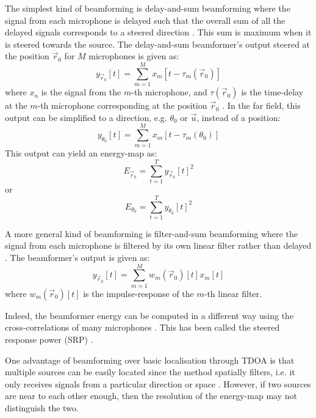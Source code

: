 \documentclass{report}
\begin{document}
The simplest kind of beamforming is delay-and-sum beamforming where the signal from each microphone is delayed such that the overall sum of all the delayed signals corresponds to a steered direction \cite{rascon_localization_2017}. This sum is maximum when it is steered towards the source. The delay-and-sum beamformer's output steered at the position $\vec{r}_0$ for $M$ microphones is given as:
\begin{equation}
y_{\vec{r}_0}[t] = \sum_{m=1}^M x_m[t-\tau_m(\vec{r}_0)] 
\end{equation}
where $x_n$ is the signal from the $m$-th microphone, and $\tau(\vec{r}_0)$ is the time-delay at the $m$-th microphone corresponding at the position $\vec{r}_0$ \cite{argentieri_survey_2015}. In the far field, this output can be simplified to a direction, e.g. $\theta_0$ or $\vec{u}$, instead of a position:
\begin{equation}
y_{\theta_0}[t] = \sum_{m=1}^M x_m[t-\tau_m(\theta_0)] 
\end{equation}
This output can yield an energy-map as:
\begin{equation}
E_{\vec{r}_0} = \sum_{t=1}^T y_{\vec{r}_0}[t]^2
\end{equation}
or
\begin{equation}
E_{\theta_0} = \sum_{t=1}^T y_{\theta_0}[t]^2
\end{equation}

A more general kind of beamforming is filter-and-sum beamforming where the signal from each microphone is filtered by its own linear filter rather than delayed \cite{argentieri_survey_2015}. The beamformer's output is given as:
\begin{equation}
y_{\vec{r}_0}[t] = \sum_{m=1}^M w_m(\vec{r}_0)[t]x_m[t]
\end{equation} 
where $w_m(\vec{r}_0)[t]$ is the impulse-response of the $m$-th linear filter.

Indeed, the beamformer energy can be computed in a different way using the cross-correlations of many microphones \cite{valin_localization_2004} \cite{valin_robust_2007} \cite{argentieri_survey_2015} \cite{rascon_localization_2017}. This has been called the steered response power (SRP) \cite{badali_evaluating_2009}. 

One advantage of beamforming over basic localisation through TDOA is that multiple sources can be easily located since the method spatially filters, i.e. it only receives signals from a particular direction or space \cite{rascon_localization_2017}. However, if two sources are near to each other enough, then the resolution of the energy-map may not distinguish the two.
\end{document}
